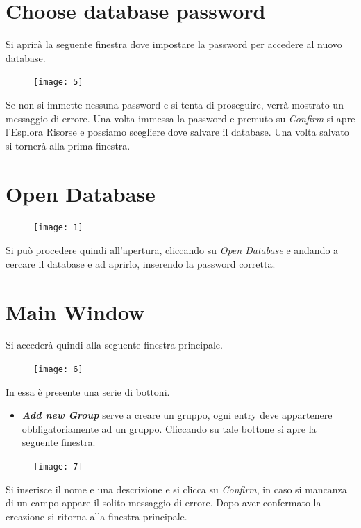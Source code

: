 \documentclass[a4paper,12pt]{report}
\begin{document}
\clearpage

\section*{Choose database password}
Si aprirà la seguente finestra dove impostare la password per accedere al nuovo database.

\begin{figure}[h]
\centering{}
\texttt{[image: 5]}
\end{figure}
Se non si immette nessuna password e si tenta di proseguire, verrà mostrato un messaggio di errore.
Una volta immessa la password e premuto su \textit{Confirm} si apre l’Esplora Risorse e possiamo scegliere dove salvare il database. Una volta salvato si tornerà alla prima finestra.

\clearpage


\section*{Open Database}
\begin{figure}[h]
\centering{}
\texttt{[image: 1]}
\end{figure}

Si può procedere quindi all’apertura, cliccando su \textit{Open Database} e andando a cercare il database e ad aprirlo, inserendo la password corretta.

\clearpage

\section*{Main Window}
Si accederà quindi alla seguente finestra principale.

\begin{figure}[h]
\centering{}
\texttt{[image: 6]}
\end{figure}

In essa è presente una serie di bottoni.
\begin{itemize}
    \item \textbf{\textit{Add new Group}} serve a creare un gruppo, ogni entry deve appartenere obbligatoriamente ad un gruppo. Cliccando su tale bottone si apre la seguente finestra.
\end{itemize}
\clearpage
\begin{figure}[h]
\centering{}
\texttt{[image: 7]}
\end{figure}

Si inserisce il nome e una descrizione e si clicca su \textit{Confirm}, in caso si mancanza di un campo appare il solito messaggio di errore. Dopo aver confermato la creazione si ritorna alla finestra principale.
\end{document}
